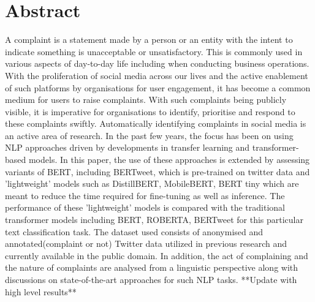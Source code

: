 \chapter*{\Large \center Abstract}

A complaint is a statement made by a person or an entity with the intent to indicate something is unacceptable or unsatisfactory. This is commonly used in various aspects of day-to-day life including when conducting business operations. With the proliferation of social media across our lives and the active enablement of such platforms by organisations for user engagement, it has become a common medium for users to raise complaints. With such complaints being publicly visible, it is imperative for organisations to identify, prioritise and respond to these complaints swiftly. Automatically identifying complaints in social media is an active area of research. In the past few years, the focus has been on using NLP approaches driven by developments in transfer learning and transformer-based models.
\newline \newline
In this paper, the use of these approaches is extended by assessing variants of BERT, including BERTweet, which is pre-trained on twitter data and 'lightweight' models such as DistillBERT, MobileBERT, BERT tiny which are meant to reduce the time required for fine-tuning as well as inference. The performance of these 'lightweight' models is compared with the traditional transformer models including BERT, ROBERTA, BERTweet for this particular text classification task. The dataset used consists of anonymised and annotated(complaint or not) Twitter data utilized in previous research and currently available in the public domain. In addition, the act of complaining and the nature of complaints are analysed from a linguistic perspective along with discussions on state-of-the-art approaches for such NLP tasks.
\newline \newline
**Update with high level results**